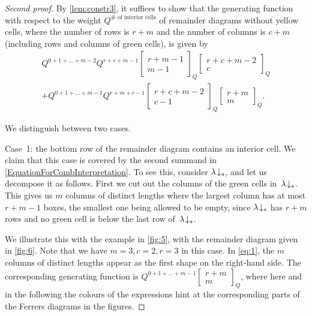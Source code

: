\documentclass[12pt,reqno]{amsart}
\numberwithin{equation}{section}
\theoremstyle{definition}
\newcommand{\lab}[1]{\hbox{${\lambda}\!\downarrow_{#1}$}}
\begin{document}
\begin{proof}[Second proof]

By \cref{lem:constr3}, it suffices to show that the generating function with respect to the weight $Q^{\# \text{ of interior cells}}$ of remainder diagrams without yellow cells, where the number of rows is $r+m$ and the number of columns is $c+m$ (including rows and columns of green cells), is given by
\begin{multline}\label{EquationForCombInterpretation}
	Q^{0+1+\dots+m-2}Q^{r+c+m-1}\begin{bmatrix} r+m-1 \\ m-1 \end{bmatrix}_Q\begin{bmatrix} r+c+m-2 \\ c\end{bmatrix}_Q \\
	+Q^{0+1+\dots+m-1}Q^{r+m+c-1}\begin{bmatrix} r+c+m-2 \\ c-1 \end{bmatrix}_Q \begin{bmatrix} r+m \\ m \end{bmatrix}_Q.
\end{multline}

We distinguish between two cases.

\medskip
\noindent
{\sc Case~1}: {\sc the bottom row of the remainder diagram contains an
interior cell.} 
 We claim that this case is covered by the second summand in
    \eqref{EquationForCombInterpretation}. To see this, consider
    $\lab{s}$, and let us decompose it as follows. First we cut out the
    columns of the green cells in~$\lab{s}$.  This gives us
    $m$ columns of distinct lengths where the largest column has at most
    $r+m-1$ boxes, the smallest one being allowed to be empty,
    since  $\lab{s}$ has $r+m$ rows and no green cell is
    below the last row of~$\lab{s}$. 
     
     We illustrate this with the example in \cref{fig:5}, with the remainder diagram given in \cref{fig:6}. 
   Note that we have   $m=3,c=2,r=3$ in this case.
     In \cref{eq:1},
    the $m$ columns of distinct lengths appear as the first shape on the right-hand
    side. The corresponding generating function is
    \textcolor{leftcell}{{$Q^{0+1+\dots+m-1}\left[\begin{smallmatrix}
    r+m \\ m\end{smallmatrix} \right]_Q$}}, where here and in the following 
    the colours of the expressions hint at the corresponding parts of the Ferrers diagrams in the figures.
    

\end{proof}
\end{document}
